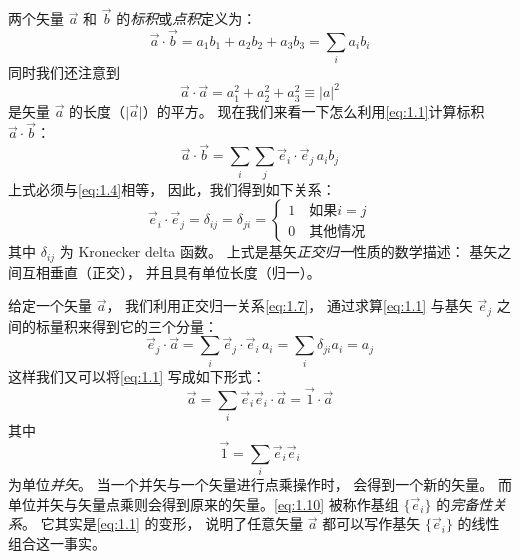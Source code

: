 两个矢量 $\vec{a}$ 和 $\vec{b}$ 的\emph{标积}或\emph{点积}定义为：
\begin{equation}
 \vec{a}\cdot\vec{b} = a_1 b_1 + a_2 b_2 + a_3 b_3 = \sum_i a_i b_i
 \label{eq:1.4}
\end{equation}
同时我们还注意到
\begin{equation}
 \vec{a}\cdot\vec{a} = a_1^2 + a_2^2 + a_3^2 \equiv \vert a\vert^2
 \label{eq:1.5}
\end{equation}
是矢量 $\vec{a}$ 的长度（$\vert \vec{a}\vert$）的平方。
现在我们来看一下怎么利用\autoref{eq:1.1}计算标积 $\vec{a}\cdot\vec{b}$：
\begin{equation}
 \vec{a}\cdot\vec{b} = \sum_i\sum_j \vec{e}_i\cdot\vec{e}_j\, a_i b_j
 \label{eq:1.6}
\end{equation}
上式必须与\autoref{eq:1.4}相等，
因此，我们得到如下关系：
\begin{equation}
 \vec{e}_i \cdot \vec{e}_j = \delta_{ij} = \delta_{ji} = 
          \begin{cases}
           1 \quad \text{如果$i=j$} \\
                    0 \quad \text{其他情况}
 \end{cases}
 \label{eq:1.7}
\end{equation}
其中 $\delta_{ij}$ 为 Kronecker delta 函数。
上式是基矢\emph{正交归一}性质的数学描述：
基矢之间互相垂直（正交），
并且具有单位长度（归一）。 

给定一个矢量 $\vec{a}$，
我们利用正交归一关系\autoref{eq:1.7}，
通过求算\autoref{eq:1.1} 与基矢 $\vec{e}_j$ 之间的标量积来得到它的三个分量：
\begin{equation}
 \vec{e}_j \cdot \vec{a} = \sum_i \vec{e}_j \cdot \vec{e}_i\, a_i = \sum_i \delta_{ji} a_i = a_j
 \label{eq:1.8}
\end{equation}
这样我们又可以将\autoref{eq:1.1} 写成如下形式：
\begin{equation}
 \vec{a} = \sum_i \vec{e}_i\vec{e}_i \cdot \vec{a} = \vec{1}\cdot\vec{a}
 \label{eq:1.9}
\end{equation}
其中
\begin{equation}
 \vec{1} = \sum_i \vec{e}_i \vec{e}_i
 \label{eq:1.10}
\end{equation}
为单位\emph{并矢}。
当一个并矢与一个矢量进行点乘操作时，
会得到一个新的矢量。
而单位并矢与矢量点乘则会得到原来的矢量。\autoref{eq:1.10} 被称作基组 $\{\vec{e}_i\}$ 的\emph{完备性关系}。
它其实是\autoref{eq:1.1} 的变形，
说明了任意矢量 $\vec{a}$ 都可以写作基矢
$\{\vec{e}_i\}$ 的线性组合这一事实。

